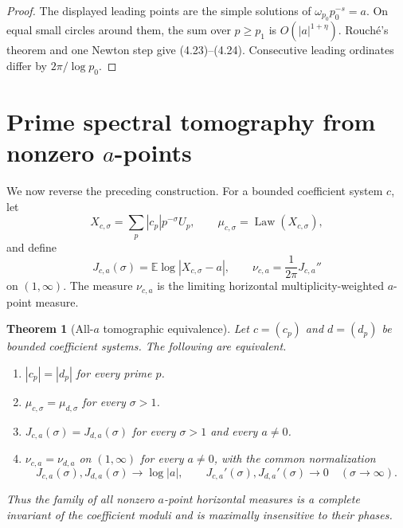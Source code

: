 \documentclass[11pt]{article}
\newtheorem{theorem}{Theorem}[section]
\theoremstyle{definition}
\theoremstyle{remark}
\begin{document}
\begin{proof}
The displayed leading points are the simple solutions of
$\omega_{p_0}p_0^{-s}=a$.  On equal small circles around them, the sum over
$p\ge p_1$ is $O(|a|^{1+\eta})$.  Rouch\'e's theorem and one Newton step give
(4.23)--(4.24).  Consecutive leading ordinates differ by $2\pi/\log p_0$.
\end{proof}

\section{Prime spectral tomography from nonzero \texorpdfstring{$a$}{a}-points}
\label{sec:tomography}

We now reverse the preceding construction.  For a bounded coefficient system $c$, let
\[
 X_{c,\sigma}=\sum_p|c_p|p^{-\sigma}U_p,
 \qquad
 \mu_{c,\sigma}=\operatorname{Law}(X_{c,\sigma}),
\tag{5.1}
\]
and define
\[
 J_{c,a}(\sigma)=\mathbb E\log|X_{c,\sigma}-a|,
 \qquad
 \nu_{c,a}=\frac1{2\pi}J_{c,a}''
\tag{5.2}
\]
on $(1,\infty)$.  The measure $\nu_{c,a}$ is the limiting horizontal
multiplicity-weighted $a$-point measure.

\begin{theorem}[All-$a$ tomographic equivalence]
\label{thm:all-a-tomography}
Let $c=(c_p)$ and $d=(d_p)$ be bounded coefficient systems.  The following are
equivalent.
\begin{enumerate}[label=\textup{(\roman*)}]
\item $|c_p|=|d_p|$ for every prime $p$.
\item $\mu_{c,\sigma}=\mu_{d,\sigma}$ for every $\sigma>1$.
\item $J_{c,a}(\sigma)=J_{d,a}(\sigma)$ for every $\sigma>1$ and every $a\ne0$.
\item $\nu_{c,a}=\nu_{d,a}$ on $(1,\infty)$ for every $a\ne0$, with the common
normalization
\[
 J_{c,a}(\sigma),J_{d,a}(\sigma)\longrightarrow\log|a|,
 \qquad
 J_{c,a}'(\sigma),J_{d,a}'(\sigma)\longrightarrow0
\quad(\sigma\to\infty).
\]
\end{enumerate}
Thus the family of all nonzero $a$-point horizontal measures is a complete invariant
of the coefficient moduli and is maximally insensitive to their phases.
\end{theorem}
\end{document}
